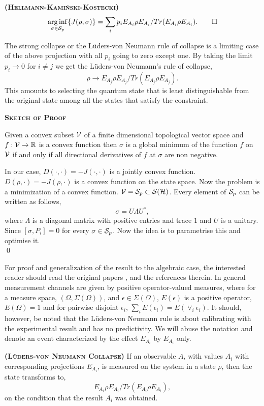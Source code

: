 \documentclass[11pt]{report}
\begin{document}
\begin{theorem}
	{\bfseries{\textsc{(Hellmann-Kami\'nski-Kostecki)}}}
	$$\arginf_{\sigma\in \mathcal{S}_p}\{J(\rho,\sigma)\}=\sum_{i}p_i {E_{A_i}\rho E_{A_i}}/{Tr(E_{A_i}\rho E_{A_i})}.\hfill \qed$$
\end{theorem}

The strong collapse or the L\"uders-von Neumann rule of collapse is a limiting case of the above projection with all $p_i$ going to zero except one. By taking the limit $p_i\to 0$ for $i\neq j$ we get the L\"uders-von Neumann's rule of collapse,
$$\rho\to {{E_{A_j}\rho E_{A_j}}}/{{Tr(E_{A_j}\rho E_{A_j})}}.$$
This amounts to selecting the quantum state that is least distinguishable from the original state among all the states that satisfy the constraint. 
\begin{center}
	{\large \bfseries\textsc{Sketch of Proof}}
\end{center}
Given a convex subset $\mathcal{V}$ of a finite dimensional topological vector space and $f:\mathcal{V}\to \mathbb{R}$ is a convex function then $\sigma$ is a global minimum of the function $f$ on $\mathcal{V}$ if and only if all directional derivatives of $f$ at $\sigma$ are non negative. 

In our case, $D(\cdot,\cdot)=-J(\cdot,\cdot)$ is a jointly convex function. $D(\rho,\cdot)=-J(\rho,\cdot)$ is a convex function on the state space. Now the problem is a minimization of a convex function. $\mathcal{V}=\mathcal{S}_p\subset \mathcal{S}(\mathcal {H})$. Every element of $\mathcal{S}_p$ can be written as follows,
$$\sigma=U\Lambda U^*,$$
where $\Lambda$ is a diagonal matrix with positive entries and trace $1$ and $U$ is a unitary. Since $[\sigma,P_i]=0$ for every $\sigma\in\mathcal{S}_p$. Now the idea is to parametrise this and optimise it. 
\\\qed

\vspace{3em}
For proof and generalization of the result to the algebraic case, the interested reader should read the original papers \cite{Kostecki1},\cite{Kostecki3} and the references therein. In general measurement channels are given by positive operator-valued measures, where for a measure space, $(\Omega,\Sigma(\Omega))$, and $\epsilon\in\Sigma(\Omega)$, $E(\epsilon)$ is a positive operator, $E(\Omega)=1$ and for pairwise disjoint $\epsilon_i$,
$\sum_i E(\epsilon_i)=E(\vee_i \epsilon_i).$
It should, however, be noted that the L\"uders-von Neumann rule is about calibrating with the experimental result and has no predictivity. We will abuse the notation and denote an event characterized by the effect $E_{A_i}$ by $E_{A_i}$ only.
\label{section:Collapse}
\vspace{1em}
\begin{postulate}
	{\bfseries{\textsc{(L\"uders-von Neumann Collapse)}}} If an observable $A$, with values $A_i$ with corresponding projections $E_{A_i}$, is measured on the system in a state $\rho$, then the state transforms to,
	$$E_{A_i}\rho E_{A_i}/Tr(E_{A_i}\rho E_{A_i}),$$
	on the condition that the result $A_i$ was obtained.
\end{postulate}
\vspace{1em}
\end{document}
